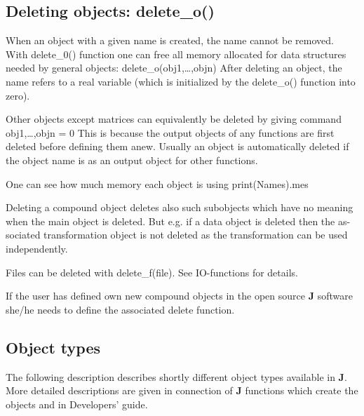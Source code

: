 \subsection{Deleting objects: delete\_o()}
\label{delete}
When an object with a given name is created, the name cannot be removed. With
delete\_0() function one can free all memory allocated for data structures needed
by general objects:
delete\_o(obj1,…,objn)
After deleting an object, the name refers to a real variable (which is
initialized by the delete\_o() function into zero).
\begin{note}
Other objects except matrices can equivalently be deleted by giving
command
obj1,…,objn = 0
This is because the output objects of any functions are first deleted before
defining them anew. Usually an object is automatically deleted if the object
name is as an output object for other functions.
\end{note}
\begin{note}
One can see how much memory each object is using \textcolor{VioletRed}{print}(Names).mes
\end{note}
\begin{note}
Deleting a compound object deletes also such
subobjects which have no meaning when the main object is deleted. But e.g. if a
data object is deleted then the as-sociated transformation object is not
deleted as the transformation can be used independently.
\end{note}
\begin{note}
Files can be deleted with delete\_f(file). See IO-functions for
details.
\end{note}
\begin{note}
If the user has defined own new compound objects in the open source
\textbf{J} software she/he needs to define the associated delete function.
\end{note}
\subsection{Object types}
\label{otypes}
The following description describes shortly different object types available in
\textbf{J}. More detailed descriptions are given in connection of \textbf{J} functions which
create the objects and in Developers' guide.
